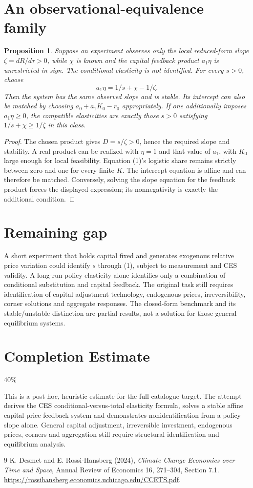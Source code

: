 \documentclass[11pt]{article}
\newtheorem{proposition}[theorem]{Proposition}
\theoremstyle{definition}
\begin{document}
\section*{An observational-equivalence family}
\begin{proposition}
Suppose an experiment observes only the local reduced-form slope
$\zeta=dR/d\tau>0$, while $\chi$ is known and the capital feedback product
$a_1\eta$ is unrestricted in sign. The conditional elasticity is not
identified. For every $s>0$, choose
\[
 a_1\eta=1/s+\chi-1/\zeta.
\]
Then the system has the same observed slope and is stable. Its intercept
can also be matched by choosing $a_0+a_1K_0-r_0$ appropriately.
If one additionally imposes $a_1\eta\ge0$, the compatible elasticities
are exactly those $s>0$ satisfying $1/s+\chi\ge1/\zeta$ in this class.
\end{proposition}
\begin{proof}
The chosen product gives $D=s/\zeta>0$, hence the required slope and
stability. A real product can be realized with $\eta=1$ and that value
of $a_1$, with $K_0$ large enough for local feasibility. Equation (1)'s
logistic share remains strictly between zero and one for every finite $K$.
The intercept equation is affine and can therefore be matched. Conversely,
solving the slope equation for the feedback product forces the displayed
expression; its nonnegativity is exactly the additional condition.
\end{proof}

\section*{Remaining gap}
A short experiment that holds capital fixed and generates exogenous relative
price variation could identify $s$ through (1), subject to measurement and
CES validity. A long-run policy elasticity alone identifies only a combination
of conditional substitution and capital feedback. The original task still
requires identification of capital adjustment technology, endogenous prices,
irreversibility, corner solutions and aggregate responses. The closed-form
benchmark and its stable/unstable distinction are partial results, not a
solution for those general equilibrium systems.

\section{Completion Estimate}
40\%

This is a post hoc, heuristic estimate for the full catalogue target.
The attempt derives the CES conditional-versus-total elasticity formula, solves a stable affine capital-price feedback system and demonstrates nonidentification from a policy slope alone. General capital adjustment, irreversible investment, endogenous prices, corners and aggregation still require structural identification and equilibrium analysis.

\begin{thebibliography}{9}
 K. Desmet and E. Rossi-Hansberg (2024),
\emph{Climate Change Economics over Time and Space}, Annual Review of
Economics 16, 271--304, Section 7.1.
\url{https://rossihansberg.economics.uchicago.edu/CCETS.pdf}.
\end{thebibliography}
\end{document}
